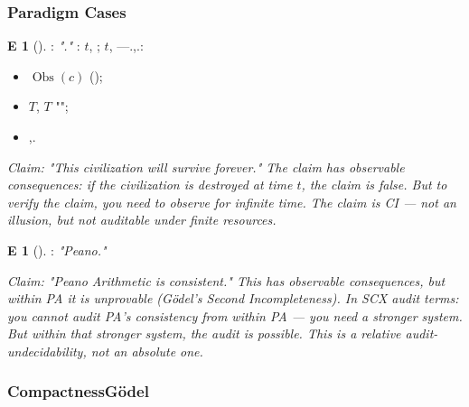 \documentclass[12pt,a4paper]{article}
\theoremstyle{plain}
\theoremstyle{definition}
\newtheorem{example}[theorem]Example
\theoremstyle{remark}
\DeclareMathOperator{\ObsSet}{Obs}
\begin{document}
\subsubsection{Paradigm Cases}
\begin{example}[]\label{ex:civilization}
: \textit{"."}
: $t$, ; $t$, ---.\textit{},.: 
\begin{itemize}
 \item $\ObsSet(c)$ (); 
 \item $T$, $T$ ""; 
 \item,.
\end{itemize}
\end{example}
\vspace{4pt}
\noindent
\textit{Claim: "This civilization will survive forever." The claim has observable consequences: if the civilization is destroyed at time $t$, the claim is false. But to verify the claim, you need to observe for infinite time. The claim is CI --- not an illusion, but not auditable under finite resources.}
\begin{example}[]\label{ex:consistency}
: \textit{"Peano."}
\end{example}
\vspace{4pt}
\noindent
\textit{Claim: "Peano Arithmetic is consistent." This has observable consequences, but within PA it is unprovable (G\"odel's Second Incompleteness). In SCX audit terms: you cannot audit PA's consistency from within PA --- you need a stronger system. But within that stronger system, the audit is possible. This is a relative audit-undecidability, not an absolute one.}
\subsubsection{CompactnessG\"odel}
\end{document}
